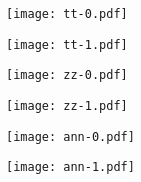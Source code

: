 \clearpage
\thispagestyle{empty}
 \begin{figure}[h!]
    \centering
    \texttt{[image: tt-0.pdf]}
    \label{fig:title-1}
\end{figure}
\begin{figure}[h!]
    \centering
    \texttt{[image: tt-1.pdf]}
    \label{fig:title-0}
\end{figure}
\begin{figure}[h!]
    \centering
    \texttt{[image: zz-0.pdf]}
    \label{fig:zz-0}
\end{figure}
\begin{figure}[h!]
    \centering
    \texttt{[image: zz-1.pdf]}
    \label{fig:zz-1}
\end{figure}
\begin{figure}[h!]
    \centering
    \texttt{[image: ann-0.pdf]}
    \label{fig:ann-0}
\end{figure}
\begin{figure}[h!]
    \centering
    \texttt{[image: ann-1.pdf]}
    \label{fig:ann-1}
\end{figure}
\restoregeometry
\clearpage
{}